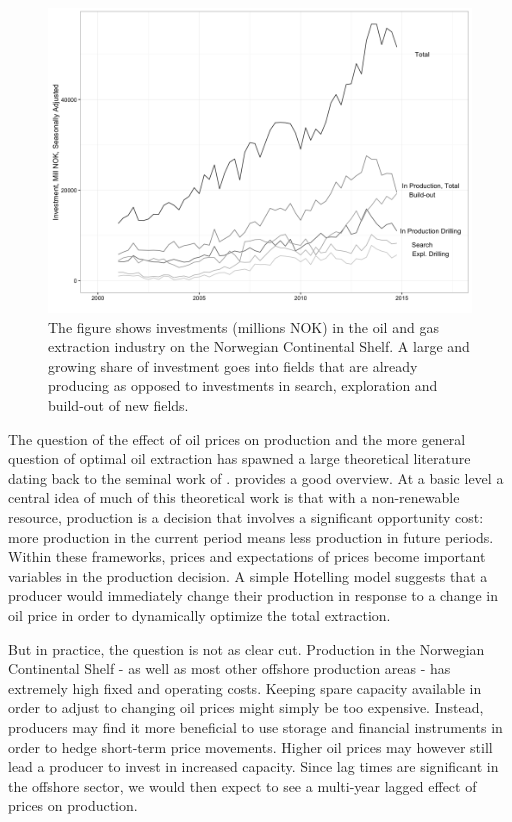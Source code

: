 \documentclass[12pt]{article}
\begin{document}
\begin{figure}
	\center
	\includegraphics[width=.9\textwidth]{figures/investment.png}
	\caption{The figure shows investments (millions NOK) in the oil and gas extraction industry on the Norwegian Continental Shelf. A large and growing share of investment goes into fields that are already producing as opposed to investments in search, exploration and build-out of new fields.}
	\label{investment}
\end{figure} 

The question of the effect of oil prices on production and the more general question of optimal oil extraction has spawned a large theoretical literature dating back to the seminal work of \citet{hotelling_economics_1931}. \citet{krautkraemer_nonrenewable_1998} provides a good overview. At a basic level a central idea of much of this theoretical work is that with a non-renewable resource, production is a decision that involves a significant opportunity cost: more production in the current period means less production in future periods.  Within these frameworks, prices and expectations of prices become important variables in the production decision. A simple Hotelling model suggests that a producer would immediately change their production in response to a change in oil price in order to dynamically optimize the total extraction.

But in practice, the question is not as clear cut.  Production in the Norwegian Continental Shelf - as well as most other offshore production areas - has extremely high fixed and operating costs.  Keeping spare capacity available in order to adjust to changing oil prices might simply be too expensive.  Instead, producers may find it more beneficial to use storage and financial instruments in order to hedge short-term price movements. Higher oil prices may however still lead a producer to invest in increased capacity.  Since lag times are significant in the offshore sector, we would then expect to see a multi-year lagged effect of prices on production.  
\end{document}
